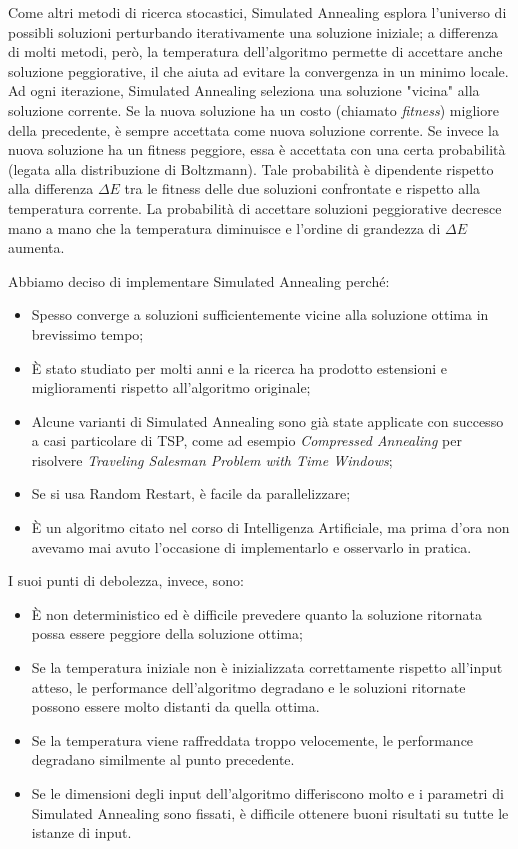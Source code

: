 \noindent Come altri metodi di ricerca stocastici, Simulated Annealing esplora l'universo di possibli soluzioni perturbando iterativamente una soluzione iniziale; a differenza di molti metodi, però, la temperatura dell'algoritmo permette di accettare anche soluzione peggiorative, il che aiuta ad evitare la convergenza in un minimo locale. \\

\noindent Ad ogni iterazione, Simulated Annealing seleziona una soluzione "vicina" alla soluzione corrente. Se la nuova soluzione ha un costo (chiamato \textit{fitness}) migliore della precedente, è sempre accettata come nuova soluzione corrente. Se invece la nuova soluzione ha un fitness peggiore, essa è accettata con una certa probabilità (legata alla distribuzione di Boltzmann). Tale probabilità è dipendente rispetto alla differenza $\Delta E$ tra le fitness delle due soluzioni confrontate e rispetto alla temperatura corrente. La probabilità di accettare soluzioni peggiorative decresce mano a mano che la temperatura diminuisce e l'ordine di grandezza di $\Delta E$ aumenta.

\noindent Abbiamo deciso di implementare Simulated Annealing perché:

\begin{itemize}
    \item Spesso converge a soluzioni sufficientemente vicine alla soluzione ottima in brevissimo tempo;
    \item È stato studiato per molti anni e la ricerca ha prodotto estensioni e miglioramenti rispetto all'algoritmo originale;
    \item Alcune varianti di Simulated Annealing sono già state applicate con successo a casi particolare di TSP, come ad esempio \textit{Compressed Annealing} per risolvere \textit{Traveling Salesman Problem with Time Windows};
    \item Se si usa Random Restart, è facile da parallelizzare;
    \item È un algoritmo citato nel corso di Intelligenza Artificiale, ma prima d'ora non avevamo mai avuto l'occasione di implementarlo e osservarlo in pratica.
\end{itemize}

\noindent I suoi punti di debolezza, invece, sono:

\begin{itemize}
    \item È non deterministico ed è difficile prevedere quanto la soluzione ritornata possa essere peggiore della soluzione ottima;
    \item Se la temperatura iniziale non è inizializzata correttamente rispetto all'input atteso, le performance dell'algoritmo degradano e le soluzioni ritornate possono essere molto distanti da quella ottima.
    \item Se la temperatura viene raffreddata troppo velocemente, le performance degradano similmente al punto precedente.
    \item Se le dimensioni degli input dell'algoritmo differiscono molto e i parametri di Simulated Annealing sono fissati, è difficile ottenere buoni risultati su tutte le istanze di input.
\end{itemize}


